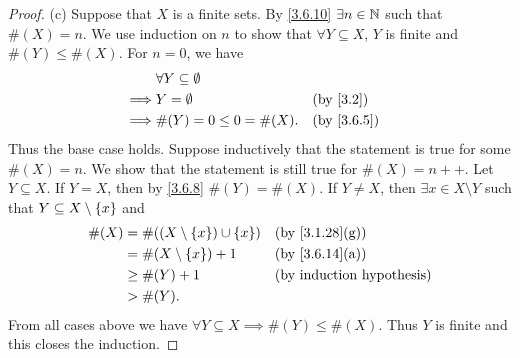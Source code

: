 \begin{proof}{(c)}
	Suppose that \(X\) is a finite sets.
	By \cref{3.6.10} \(\exists n \in \mathbb{N}\) such that \(\#(X) = n\).
	We use induction on \(n\) to show that \(\forall Y \subseteq X\), \(Y\) is finite and \(\#(Y) \leq \#(X)\).
	For \(n = 0\), we have
	\begin{align*}
		         & \forall Y \subseteq \emptyset                 \\
		\implies & Y = \emptyset                 &  & \by{3.2}   \\
		\implies & \#(Y) = 0 \leq 0 = \#(X).     &  & \by{3.6.5}
	\end{align*}
	Thus the base case holds.
	Suppose inductively that the statement is true for some \(\#(X) = n\).
	We show that the statement is still true for \(\#(X) = n++\).
	Let \(Y \subseteq X\).
	If \(Y = X\), then by \cref{3.6.8} \(\#(Y) = \#(X)\).
	If \(Y \neq X\), then \(\exists x \in X \setminus Y\) such that \(Y \subseteq X \setminus \left\lbrace x\right\rbrace\) and
	\begin{align*}
		\#(X) & = \#((X \setminus \set{x}) \cup \set{x}) &  & \text{(by \cref{3.1.28}(g))} \\
		      & = \#(X \setminus \set{x}) + 1            &  & \text{(by \cref{3.6.14}(a))} \\
		      & \geq \#(Y) + 1                           &  & \byIH                        \\
		      & > \#(Y).
	\end{align*}
	From all cases above we have \(\forall Y \subseteq X \implies \#(Y) \leq \#(X)\).
	Thus \(Y\) is finite and this closes the induction.


\end{proof}
